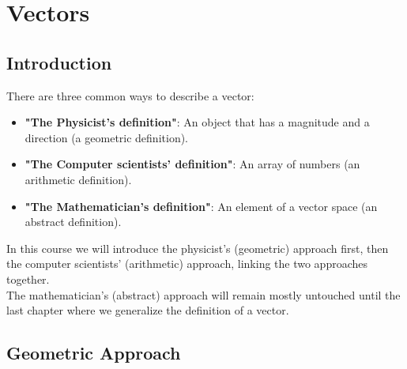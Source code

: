 \chapter{Vectors}
\section{Introduction}
There are three common ways to describe a vector:
\begin{itemize}
  \item \textbf{"The Physicist's definition"}: An object that has a magnitude and a direction (a geometric definition).
  \item \textbf{"The Computer scientists' definition"}: An array of numbers (an arithmetic definition).
  \item \textbf{"The Mathematician's definition"}: An element of a vector space (an abstract definition).
\end{itemize}
In this course we will introduce the physicist's (geometric) approach first, then the computer scientists' (arithmetic) approach, linking the two approaches together.\\ The mathematician's (abstract) approach will remain mostly untouched until the last chapter where we generalize the definition of a vector.

\section{Geometric Approach}
